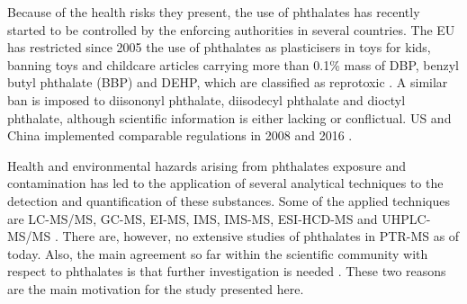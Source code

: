 %

Because of the health risks they present, the use of phthalates has recently started to be controlled by the enforcing authorities in several countries. The EU has restricted since 2005 the use of phthalates as plasticisers in toys for kids, banning toys and childcare articles carrying more than  0.1\% mass of DBP, %
benzyl butyl phthalate (BBP)  and DEHP, which are classified as reprotoxic  
\cite{Parliament2005}. 
A similar ban is imposed to diisononyl phthalate, diisodecyl phthalate and dioctyl phthalate, although scientific information is either lacking or conflictual.
US and China  implemented comparable regulations in 2008  and 2016 \cite{USban,chinaGB6675}.



%
%
Health and environmental hazards arising from phthalates exposure and contamination has led to the application of several analytical techniques to the detection and quantification  of these substances.
%
Some of the applied techniques are
LC-MS/MS, %
GC-MS,  %
EI-MS, %
IMS, IMS-MS, %
ESI-HCD-MS %
and
UHPLC-MS/MS %
 \cite{xu2014determination,net2015reliable,GC-PICI-phthalates,lacko2018dissociation,mzcloudd,michalczuk2019isomer,fan2012determination}.
%
%
%
%
%
There are, however, no extensive studies of phthalates in PTR-MS as of today.
%
Also, the main agreement so far within the scientific community with respect to phthalates is that further investigation is needed \cite{hauser2005phthalates}.
%
These two reasons are the main motivation for the study presented here. 


